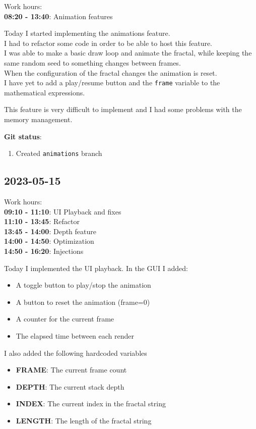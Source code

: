 \documentclass{article}
\begin{document}
Work hours:\\
\textbf{08:20 - 13:40}: Animation features

Today I started implementing the animations feature. \\
I had to refactor some code in order to be able to host this feature. \\
I was able to make a basic draw loop and animate the fractal, while keeping
the same random seed to something changes between frames. \\
When the configuration of the fractal changes the animation is reset. \\
I have yet to add a play/resume button and the \texttt{frame} variable
to the mathematical expressions.

This feature is very difficult to implement and I had some problems with the
memory management.

\textbf{Git status}:
\begin{enumerate}
    \item Created \texttt{animations} branch
\end{enumerate}

\subsection{2023-05-15}

Work hours:\\
\textbf{09:10 - 11:10}: UI Playback and fixes \\
\textbf{11:10 - 13:45}: Refactor \\
\textbf{13:45 - 14:00}: Depth feature \\
\textbf{14:00 - 14:50}: Optimization \\
\textbf{14:50 - 16:20}: Injections

Today I implemented the UI playback.
In the GUI I added:
\begin{itemize}
    \item A toggle button to play/stop the animation
    \item A button to reset the animation (frame=0)
    \item A counter for the current frame
    \item The elapsed time between each render
\end{itemize}

I also added the following hardcoded variables

\begin{itemize}
    \item \textbf{FRAME}: The current frame count
    \item \textbf{DEPTH}: The current stack depth
    \item \textbf{INDEX}: The current index in the fractal string
    \item \textbf{LENGTH}: The length of the fractal string
\end{itemize}
\end{document}
